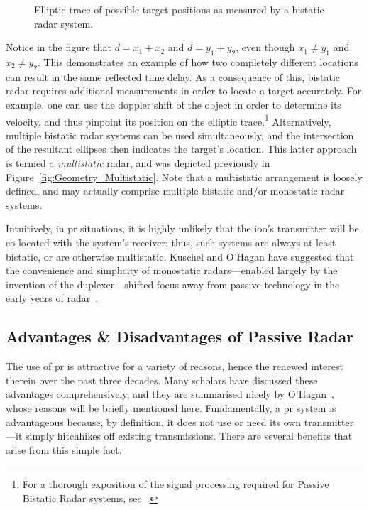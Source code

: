 \documentclass[class=report,11pt,crop=false]{standalone}
\begin{document}
\begin{figure}
    \centering
    \captionsetup{type=figure}
    \def\svgwidth{0.5\linewidth}
    {\scriptsize
        }
    \caption{Elliptic trace of possible target positions as measured by a bistatic radar system.}
    \label{fig:Elliptic_Curve}
\end{figure}

Notice in the figure that \(d = x_1 + x_2\) and \(d = y_1 + y_2\), even though \(x_1 \ne y_1\) and \(x_2 \ne y_2\). This demonstrates an example of how two completely different locations can result in the same reflected time delay. As a consequence of this, bistatic radar requires additional measurements in order to locate a target accurately. For example, one can use the doppler shift of the object in order to determine its velocity, and thus pinpoint its position on the elliptic trace.\footnote{For a thorough exposition of the signal processing required for Passive Bistatic Radar systems, see~\cite{Malanowski2019}.} Alternatively, multiple bistatic radar systems can be used simultaneously, and the intersection of the resultant ellipses then indicates the target's location. This latter approach is termed a \emph{multistatic} radar, and was depicted previously in Figure~\ref{fig:Geometry_Multistatic}. Note that a multistatic arrangement is loosely defined, and may actually comprise multiple bistatic and/or monostatic radar systems. 

Intuitively, in \gls{pr} situations, it is highly unlikely that the \gls{ioo}'s transmitter will be co-located with the system's receiver; thus, such systems are always at least bistatic, or are otherwise multistatic. Kuschel and O'Hagan have suggested that the convenience and simplicity of monostatic radars---enabled largely by the invention of the duplexer---shifted focus away from passive technology in the early years of radar~\cite{kuschel-hagan-history}.

\subsection{Advantages \& Disadvantages of Passive Radar}
The use of \gls{pr} is attractive for a variety of reasons, hence the renewed interest therein over the past three decades. Many scholars have discussed these advantages comprehensively, and they are summarised nicely by O'Hagan~\cite{o2009passive}, whose reasons will be briefly mentioned here. Fundamentally, a \gls{pr} system is advantageous because, by definition, it does not use or need its own transmitter---it simply hitchhikes off existing transmissions. There are several benefits that arise from this simple fact.
\end{document}
